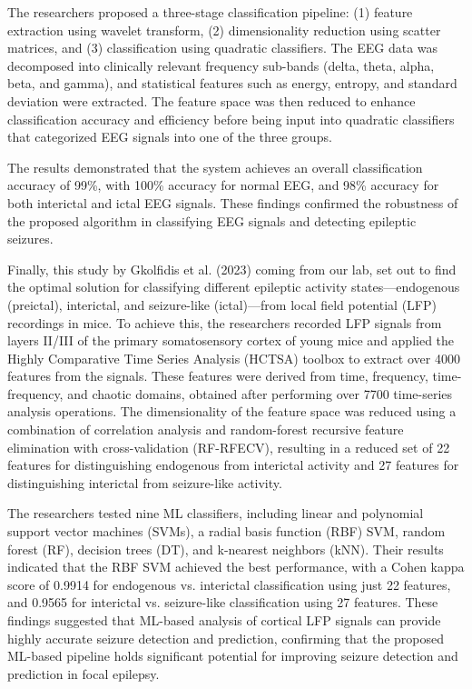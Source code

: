 \documentclass{article}
\begin{document}
The researchers proposed a three-stage classification pipeline: (1) feature extraction using wavelet transform, (2) dimensionality reduction using scatter matrices, and (3) classification using quadratic classifiers. The EEG data was decomposed into clinically relevant frequency sub-bands (delta, theta, alpha, beta, and gamma), and statistical features such as energy, entropy, and standard deviation were extracted. The feature space was then reduced to enhance classification accuracy and efficiency before being input into quadratic classifiers that categorized EEG signals into one of the three groups.

The results demonstrated that the system achieves an overall classification accuracy of 99\%, with 100\% accuracy for normal EEG, and 98\% accuracy for both interictal and ictal EEG signals. These findings confirmed the robustness of the proposed algorithm in classifying EEG signals and detecting epileptic seizures.

Finally, this study \cite{golfidis2023} by Gkolfidis et al. (2023) coming from our lab, set out to find the optimal solution for classifying different epileptic activity states—endogenous (preictal), interictal, and seizure-like (ictal)—from local field potential (LFP) recordings in mice. To achieve this, the researchers recorded LFP signals from layers II/III of the primary somatosensory cortex of young mice and applied the Highly Comparative Time Series Analysis (HCTSA) toolbox to extract over 4000 features from the signals. These features were derived from time, frequency, time-frequency, and chaotic domains, obtained after performing over 7700 time-series analysis operations. The dimensionality of the feature space was reduced using a combination of correlation analysis and random-forest recursive feature elimination with cross-validation (RF-RFECV), resulting in a reduced set of 22 features for distinguishing endogenous from interictal activity and 27 features for distinguishing interictal from seizure-like activity.

The researchers tested nine ML classifiers, including linear and polynomial support vector machines (SVMs), a radial basis function (RBF) SVM, random forest (RF), decision trees (DT), and k-nearest neighbors (kNN). Their results indicated that the RBF SVM achieved the best performance, with a Cohen kappa score of 0.9914 for endogenous vs. interictal classification using just 22 features, and 0.9565 for interictal vs. seizure-like classification using 27 features. These findings suggested that ML-based analysis of cortical LFP signals can provide highly accurate seizure detection and prediction, confirming that the proposed ML-based pipeline holds significant potential for improving seizure detection and prediction in focal epilepsy.
\end{document}

